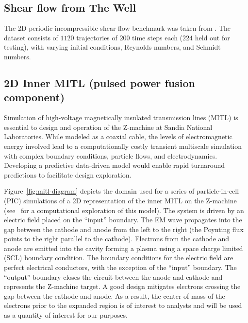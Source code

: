 \documentclass[12pt]{article}
\begin{document}
\subsection{Shear flow from The Well}
The 2D periodic incompressible shear flow benchmark was taken from \cite{ohana2024well}. The dataset consists of $1120$ trajectories of $200$ time steps each ($224$ held out for testing), with varying initial conditions, Reynolds numbers, and Schmidt numbers.

\subsection{2D Inner MITL (pulsed power fusion component)}
\label{app:mitl_dataset}

Simulation of high-voltage magnetically insulated transmission lines (MITL) is essential to design and operation of the Z-machine at Sandia National Laboratories. While modeled as a coaxial cable, the levels of electromagnetic energy involved lead to a computationally costly transient multiscale simulation with complex boundary conditions, particle flows, and electrodynamics. Developing a predictive data-driven model would enable rapid turnaround predictions to facilitate design exploration.

Figure~\ref{fig:mitl-diagram} depicts the domain used for a series of particle-in-cell (PIC) simulations of a 2D representation of the inner MITL on the Z-machine (see~\cite{sirajuddin2023mrt} for a computational exploration of this model). The system is driven by an electric field placed on the ``input'' boundary. The EM wave propagates into the gap between the cathode and anode from the left to the right (the Poynting flux points to the right parallel to the cathode). Electrons from the cathode and anode are emitted into the cavity forming a plasma using a space charge limited (SCL) boundary condition. The boundary conditions for the electric field are perfect electrical conductors, with the exception of the ``input'' boundary. The ``output'' boundary closes the circuit between the anode and cathode and represents the Z-machine target. A good design mitigates electrons crossing the gap between the cathode and anode. As a result, the center of mass of the electrons prior to the expanded region is of interest to analysts and will be used as a quantity of interest for our purposes.
\end{document}
